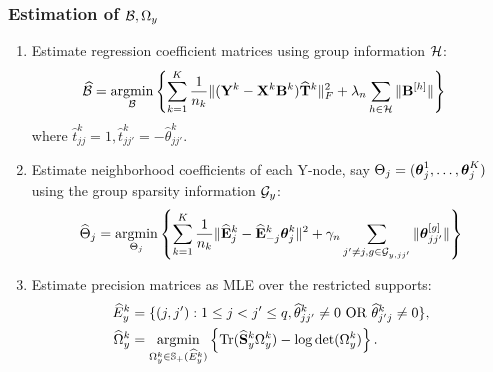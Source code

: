 \documentclass[10pt]{beamer}
\theoremstyle{definition}
\DeclareMathOperator*{\Tr}{Tr}
\DeclareMathOperator*{\argmin}{argmin}
\begin{document}
\begin{frame}
\frametitle{Estimation of ${\cal{B}}, \Omega_y$}

\begin{enumerate} 
\item Estimate regression coefficient matrices using group information ${\cal{H}}$:
\begin{align*}
\widehat \cB &= \argmin_{\cB} \left\{ \sum_{k=1}^K \frac{1}{n_k}
\| (\bfY^k - \bfX^k \bfB^k) \widehat \bfT^k \|_F^2 + 
\lambda_n \sum_{h \in \cH} \| \bfB^{[h]} \| \right\}
\end{align*}
%
where $\widehat t_{jj}^k = 1, \widehat t_{jj'}^k = - \widehat \theta_{jj'}^k$.

\item Estimate neighborhood coefficients of each Y-node, say $\Theta_j = ({\boldsymbol{\theta}}_j^1, \ldots, {\boldsymbol{\theta}}_j^K)$ using the group sparsity information ${\cal{G}}_y$:
%
$$
\widehat \Theta_j = \argmin_{\Theta_j} \left\{ \sum_{k=1}^K \frac{1}{n_k} \| \widehat \bfE_j^k - \widehat \bfE_{-j}^k \bftheta_j^k \|^2 + \gamma_n \sum_{j' \neq j, g \in \cG_{y,jj'}} \| \bftheta_{jj'}^{[g]} \| \right\}
$$

\item Estimate precision matrices as MLE over the restricted supports: %
%
\begin{align*}
\widehat E_y^k &= \{(j,j'): 1 \leq j < j' \leq q, \widehat \theta_{jj'}^k \neq 0 \text{ OR } \widehat \theta_{j'j}^k \neq 0 \},\\
\widehat \Omega_y^k &= \argmin_{\Omega_y^k \in \BS_+ (\widehat E_y^k)}
\left\{ \Tr (\widehat \bfS_y^k \Omega_y^k ) - \log \det (\Omega_y^k) \right\}.
\end{align*}
%
\end{enumerate}


\end{frame}

\end{document}
